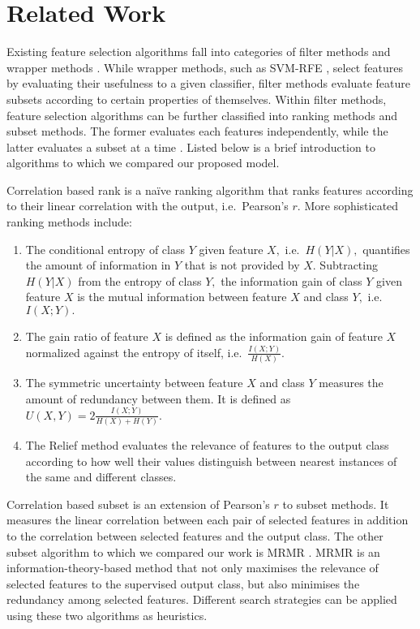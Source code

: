 \section{Related Work}

Existing feature selection algorithms fall into categories of filter
methods and wrapper methods \cite{guyon_jmlr03}. While
wrapper methods, such as SVM-RFE \cite{guyon2002gene}, select features
by evaluating their usefulness to a given classifier, filter methods
evaluate feature subsets according to certain properties of
themselves. Within filter methods, feature selection algorithms can be
further classified into ranking methods and subset methods. The former
evaluates each features independently, while the latter evaluates a
subset at a time \cite{brown2012conditional}. Listed below is a brief
introduction to algorithms to which we compared our proposed model.

Correlation based rank is a na\"{i}ve ranking algorithm that ranks
features according to their linear correlation with the output,
i.e.\ Pearson's $r.$ More sophisticated ranking methods include:
\begin{enumerate}
\item The conditional entropy of class $Y$ given feature $X,$
  i.e.\ $H\left(Y|X\right),$ quantifies the amount of information in
  $Y$ that is not provided by $X.$ Subtracting $H\left(Y|X\right)$
  from the entropy of class $Y,$ the information gain of class $Y$
  given feature $X$ is the mutual information between feature $X$ and
  class $Y,$ i.e.\ $I\left(X;Y\right).$
\item The gain ratio of feature $X$ is defined as the information gain
  of feature $X$ normalized against the entropy of itself,
  i.e.\ $\frac{I\left(X;Y\right)}{H\left(X\right)}.$
\item The symmetric uncertainty between feature $X$ and class $Y$
  measures the amount of redundancy between them. It is defined as
  $U\left(X,Y\right)=2\frac{I\left(X;Y\right)}{H\left(X\right)+H\left(Y\right)}.$
\item The Relief method \cite{kira1992feature} evaluates the relevance
  of features to the output class according to how well their values
  distinguish between nearest instances of the same and different
  classes.
\end{enumerate}

Correlation based subset \cite{Hall1998} is an extension
of Pearson's $r$ to subset methods. It measures the linear correlation
between each pair of selected features in addition to the correlation
between selected features and the output class. The other subset
algorithm to which we compared our work is MRMR \cite{peng2005}.
MRMR is an information-theory-based method that not only maximises
the relevance of selected features to the supervised output class,
but also minimises the redundancy among selected features. Different
search strategies can be applied using these two algorithms as
heuristics.

